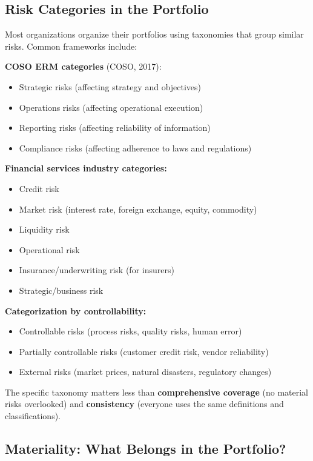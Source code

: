 \documentclass[11pt,openany]{book}
\providecommand{\tightlist}{\setlength{\itemsep}{0pt}\setlength{\parskip}{0pt}}
\begin{document}
\subsection{Risk Categories in the Portfolio}
\label{subsec:risk-categories}

Most organizations organize their portfolios using taxonomies that group
similar risks. Common frameworks include:

\textbf{COSO ERM categories} (COSO, 2017):
\begin{itemize}\tightlist
  \item Strategic risks (affecting strategy and objectives)
  \item Operations risks (affecting operational execution)
  \item Reporting risks (affecting reliability of information)
  \item Compliance risks (affecting adherence to laws and regulations)
\end{itemize}

\textbf{Financial services industry categories:}
\begin{itemize}\tightlist
  \item Credit risk
  \item Market risk (interest rate, foreign exchange, equity, commodity)
  \item Liquidity risk
  \item Operational risk
  \item Insurance/underwriting risk (for insurers)
  \item Strategic/business risk
\end{itemize}

\textbf{Categorization by controllability:}
\begin{itemize}\tightlist
  \item Controllable risks (process risks, quality risks, human error)
  \item Partially controllable risks (customer credit risk, vendor reliability)
  \item External risks (market prices, natural disasters, regulatory changes)
\end{itemize}

The specific taxonomy matters less than \textbf{comprehensive coverage} (no
material risks overlooked) and \textbf{consistency} (everyone uses the same
definitions and classifications).

\subsection{Materiality: What Belongs in the Portfolio?}
\label{subsec:materiality}
\end{document}
